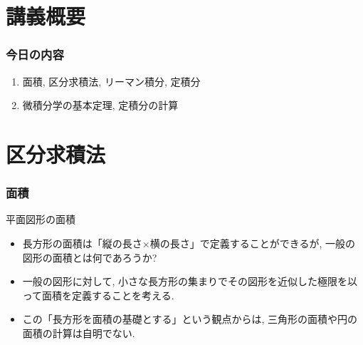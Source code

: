 
\section{講義概要}


\begin{frame}
\frametitle{今日の内容}



\begin{enumerate}
\item 面積, 区分求積法, リーマン積分, 定積分
\item 微積分学の基本定理, 定積分の計算
\end{enumerate} 



\end{frame}








\section{区分求積法}

\begin{frame}
\frametitle{面積}

平面図形の面積

\begin{itemize}
\item 長方形の面積は「縦の長さ$\times$横の長さ」で定義することができるが, 一般の図形の面積とは何であろうか? 
\item 一般の図形に対して, 小さな長方形の集まりでその図形を近似した極限を以って面積を定義することを考える. 
\item この「長方形を面積の基礎とする」という観点からは, 三角形の面積や円の面積の計算は自明でない. 
\end{itemize}

\end{frame}


